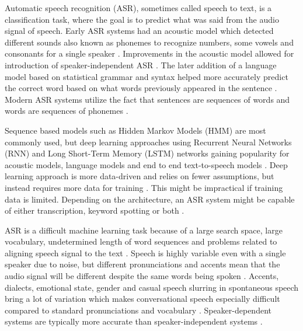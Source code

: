 \documentclass[utf8,english]{gradu3}
\begin{document}
Automatic speech recognition (ASR), sometimes called speech to text, is a classification task, where the goal is to predict what was said from the audio signal of speech. Early ASR systems had an acoustic model which detected different sounds also known as phonemes to recognize numbers, some vowels and consonants for a single speaker \parencite{juangAutomaticSpeechRecognition2005}. Improvements in the acoustic model allowed for introduction of speaker-independent ASR \parencite{benzeghibaAutomaticSpeechRecognition2007,juangAutomaticSpeechRecognition2005}. The later addition of a language model based on statistical grammar and syntax helped more accurately predict the correct word based on what words previously appeared in the sentence \parencite{juangAutomaticSpeechRecognition2005}. Modern ASR systems utilize the fact that sentences are sequences of words and words are sequences of phonemes \parencite{bengioWordEmbeddingsSpeech2014}. 

Sequence based models such as Hidden Markov Models (HMM) are most commonly used, but deep learning approaches using Recurrent Neural Networks (RNN) and Long Short-Term Memory (LSTM) networks gaining popularity for acoustic models, language models and end to end text-to-speech models \parencite{bengioWordEmbeddingsSpeech2014,enarviAutomaticSpeechRecognition2017}. Deep learning approach is more data-driven and relies on fewer assumptions, but instead requires more data for training \parencite{bengioWordEmbeddingsSpeech2014}. This might be impractical if training data is limited. Depending on the architecture, an ASR system might be capable of either transcription, keyword spotting or both \parencite{juangAutomaticSpeechRecognition2005,enarviAutomaticSpeechRecognition2017}.

ASR is a difficult machine learning task because of a large search space, large vocabulary, undetermined length of word sequences and problems related to aligning speech signal to the text \parencite{enarviAutomaticSpeechRecognition2017}. Speech is highly variable even with a single speaker due to noise, but different pronunciations and accents mean that the audio signal will be different despite the same words being spoken \parencite{juangAutomaticSpeechRecognition2005}. Accents, dialects, emotional state, gender and casual speech slurring in spontaneous speech bring a lot of variation which makes conversational speech especially difficult compared to standard pronunciations and vocabulary \parencite{benzeghibaAutomaticSpeechRecognition2007, juangAutomaticSpeechRecognition2005}. Speaker-dependent systems are typically more accurate than speaker-independent systems \parencite{benzeghibaAutomaticSpeechRecognition2007,enarviAutomaticSpeechRecognition2017}.
\end{document}
